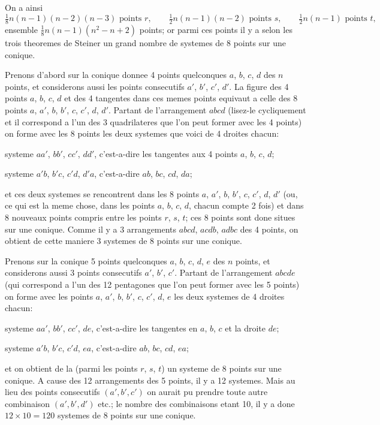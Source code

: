 \documentclass[11pt,a4paper]{article}
\theoremstyle{plain}
\begin{document}
On a ainsi
\[
\tfrac{1}{8} n (n-1)(n-2)(n-3) \text{ points } r, \qquad
\tfrac12 n(n-1)(n-2) \text{ points } s, \qquad
\tfrac12 n(n-1) \text{ points } t,
\]
ensemble $\frac18 n(n-1)(n^2 - n + 2)$ points; or parmi ces points il y a selon les trois theoremes de Steiner un grand nombre de systemes de 8 points sur une conique.

Prenons d'abord sur la conique donnee 4 points quelconques $a$, $b$, $c$, $d$ des $n$ points, et considerons aussi les points consecutifs $a'$, $b'$, $c'$, $d'$. La figure des 4 points $a$, $b$, $c$, $d$ et des 4 tangentes dans ces memes points equivaut a celle des 8 points $a$, $a'$, $b$, $b'$, $c$, $c'$, $d$, $d'$. Partant de l'arrangement $abcd$ (lisez-le cycliquement et il correspond a l'un des 3 quadrilateres que l'on peut former avec les 4 points) on forme avec les 8 points les deux systemes que voici de 4 droites chacun:

systeme $aa'$, $bb'$, $cc'$, $dd'$, c'est-a-dire les tangentes aux 4 points $a$, $b$, $c$, $d$;

systeme $a'b$, $b'c$, $c'd$, $d'a$, c'est-a-dire $ab$, $bc$, $cd$, $da$;

et ces deux systemes se rencontrent dans les 8 points $a$, $a'$, $b$, $b'$, $c$, $c'$, $d$, $d'$ (ou, ce qui est la meme chose, dans les points $a$, $b$, $c$, $d$, chacun compte 2 fois) et dans 8 nouveaux points compris entre les points $r$, $s$, $t$; ces 8 points sont done situes sur une conique. Comme il y a 3 arrangements $abcd$, $acdb$, $adbc$ des 4 points, on obtient de cette maniere 3 systemes de 8 points sur une conique.

Prenons sur la conique 5 points quelconques $a$, $b$, $c$, $d$, $e$ des $n$ points, et considerons aussi 3 points consecutifs $a'$, $b'$, $c'$. Partant de l'arrangement $abcde$ (qui correspond a l'un des 12 pentagones que l'on peut former avec les 5 points) on forme avec les points $a$, $a'$, $b$, $b'$, $c$, $c'$, $d$, $e$ les deux systemes de 4 droites chacun:

systeme $aa'$, $bb'$, $cc'$, $de$, c'est-a-dire les tangentes en $a$, $b$, $c$ et la droite $de$;

systeme $a'b$, $b'c$, $c'd$, $ea$, c'est-a-dire $ab$, $bc$, $cd$, $ea$;

et on obtient de la (parmi les points $r$, $s$, $t$) un systeme de 8 points sur une conique. A cause des 12 arrangements des 5 points, il y a 12 systemes. Mais au lieu des points consecutifs $(a', b', c')$ on aurait pu prendre toute autre combinaison $(a', b', d')$ etc.; le nombre des combinaisons etant 10, il y a done $12 \times 10 = 120$ systemes de 8 points sur une conique.
\end{document}
